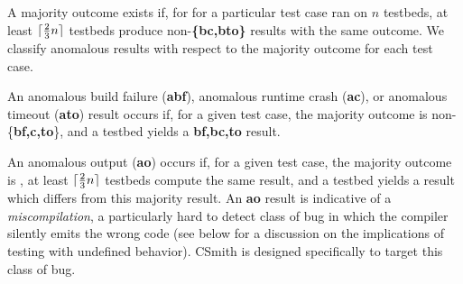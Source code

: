 A majority outcome exists if, for for a particular test case ran on $n$ testbeds, at least $\lceil\frac{2}{3}n\rceil$ testbeds produce non-\textbf{\{bc,bto\}} results with the same outcome. We classify anomalous results with respect to the majority outcome for each test case.

An anomalous build failure (\textbf{abf}), anomalous runtime crash (\textbf{ac}), or anomalous timeout (\textbf{ato}) result occurs if, for a given test case, the majority outcome is non-\{\textbf{bf,c,to}\}, and a testbed yields a \textbf{bf,bc,to} result.

An anomalous output (\textbf{ao}) occurs if, for a given test case, the majority outcome is \textbf{\cmark}, at least $\lceil\frac{2}{3}n\rceil$ testbeds compute the same result, and a testbed yields a result which differs from this majority result. An \textbf{ao} result is indicative of a \emph{miscompilation}, a particularly hard to detect class of bug in which the compiler silently emits the wrong code (see below for a discussion on the implications of testing with undefined behavior). CSmith is designed specifically to target this class of bug.



%


